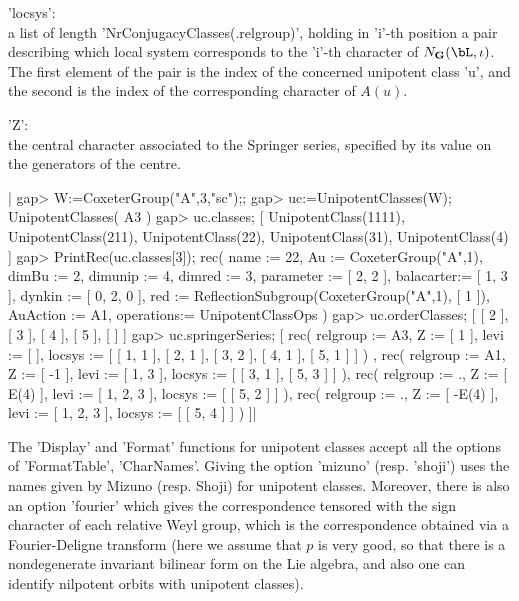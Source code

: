 'locsys':\\  a list  of length  'NrConjugacyClasses(.relgroup)', holding in
'i'-th  position a  pair describing  which local  system corresponds to the
'i'-th  character of $N_\bG(\bL,\iota)$.  The first element  of the pair is
the index of the concerned unipotent class 'u', and the second is the index
of the corresponding character of $A(u)$.

'Z':\\  the central character associated  to the Springer series, specified
by its value on the generators of the centre.

|    gap> W:=CoxeterGroup("A",3,"sc");;
    gap> uc:=UnipotentClasses(W);
    UnipotentClasses( A3 )
    gap> uc.classes;
    [ UnipotentClass(1111), UnipotentClass(211), UnipotentClass(22),
      UnipotentClass(31), UnipotentClass(4) ]
    gap> PrintRec(uc.classes[3]);
    rec(
      name      := 22,
      Au        := CoxeterGroup("A",1),
      dimBu     := 2,
      dimunip   := 4,
      dimred    := 3,
      parameter := [ 2, 2 ],
      balacarter:= [ 1, 3 ],
      dynkin    := [ 0, 2, 0 ],
      red       := ReflectionSubgroup(CoxeterGroup("A",1), [ 1 ]),
      AuAction  := A1,
      operations:= UnipotentClassOps )
    gap> uc.orderClasses;
    [ [ 2 ], [ 3 ], [ 4 ], [ 5 ], [  ] ]
    gap> uc.springerSeries;
    [ rec(
          relgroup := A3,
          Z := [ 1 ],
          levi := [  ],
          locsys := [ [ 1, 1 ], [ 2, 1 ], [ 3, 2 ], [ 4, 1 ], [ 5, 1 ] ] )
        , rec(
          relgroup := A1,
          Z := [ -1 ],
          levi := [ 1, 3 ],
          locsys := [ [ 3, 1 ], [ 5, 3 ] ] ), rec(
          relgroup := .,
          Z := [ E(4) ],
          levi := [ 1, 2, 3 ],
          locsys := [ [ 5, 2 ] ] ), rec(
          relgroup := .,
          Z := [ -E(4) ],
          levi := [ 1, 2, 3 ],
          locsys := [ [ 5, 4 ] ] ) ]|

The  'Display' and 'Format' functions for  unipotent classes accept all the
options  of 'FormatTable',  'CharNames'. Giving  the option 'mizuno' (resp.
'shoji')  uses  the  names  given  by  Mizuno  (resp.  Shoji) for unipotent
classes.  Moreover,  there  is  also  an  option  'fourier' which gives the
correspondence  tensored  with  the  sign  character  of each relative Weyl
group, which is the correspondence obtained via a Fourier-Deligne transform
(here  we assume that  $p$ is very  good, so that  there is a nondegenerate
invariant  bilinear  form  on  the  Lie  algebra, and also one can identify
nilpotent orbits with unipotent classes).

